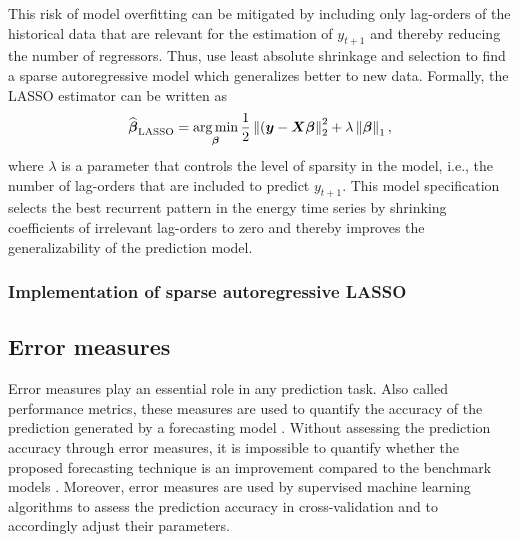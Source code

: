 This risk of model overfitting can be mitigated by including only lag-orders of the historical data that are relevant for the estimation of $y_{t+1}$ and thereby reducing the number of regressors. Thus, \citet{Li:2017} use least absolute shrinkage and selection to find a sparse autoregressive model which generalizes better to new data. Formally, the LASSO estimator can be written as
%
\begin{equation} \label{betaLASSO}
    \widehat{\boldsymbol{\beta}}_{\text{LASSO}}=\operatorname*{\arg\min}_{\boldsymbol{\beta}}\frac{1}{2}\left\lVert(\boldsymbol{y}-\boldsymbol{X}\boldsymbol{\beta}\right\rVert^2_2+\lambda\left\lVert\boldsymbol{\beta}\right\rVert_1,
\end{equation}
%
where $\lambda$ is a parameter that controls the level of sparsity in the model, i.e., the number of lag-orders that are included to predict $y_{t+1}$. This model specification selects the best recurrent pattern in the energy time series by shrinking coefficients of irrelevant lag-orders to zero and thereby improves the generalizability of the prediction model.



\subsubsection{Implementation of sparse autoregressive LASSO}






\subsection{Error measures} \label{Sec:Method;Subsec:Error}

Error measures play an essential role in any prediction task. Also called performance metrics, these measures are used to quantify the accuracy of the prediction generated by a forecasting model \citep{zor:2017}. Without assessing the prediction accuracy through error measures, it is impossible to quantify whether the proposed forecasting technique is an improvement compared to the benchmark models \citep{Meer:2018}. Moreover, error measures are used by supervised machine learning algorithms to assess the prediction accuracy in cross-validation and to accordingly adjust their parameters.

